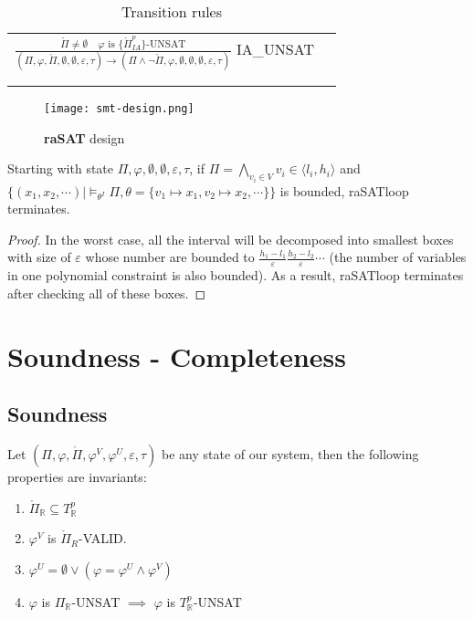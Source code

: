 \begin{table*}[t]
\begin{tabular}{ll}
  \large 
  $\frac{\mathring{\Pi} \not= \emptyset \quad \varphi \text{ is }  \{\mathring{\Pi}^p_{IA}\}\text{-UNSAT}}{(\Pi, \varphi, \mathring{\Pi}, \emptyset, \emptyset, \varepsilon, \tau) \to (\Pi \wedge \neg\mathring{\Pi}, \varphi, \emptyset, \emptyset, \emptyset, \varepsilon, \tau)}$ \tiny IA\_UNSAT \\\\
  \hline\\
  \end{tabular}
  \caption{Transition rules}\label{tab:transition-rules}
\end{table*}

\begin{figure}[ht]
\centering
\texttt{[image: smt-design.png]} 
\caption{\textbf{raSAT} design} 
\label{fig:smt-design} 
\end{figure}

\begin{theorem} \label{theorem:terminating}
Starting with state $\Pi, \varphi, \emptyset, \emptyset, \varepsilon, \tau$, if $\Pi = \bigwedge\limits_{v_i \in V} v_i \in \langle l_i, h_i \rangle$ and $\{(x_1, x_2, \cdots) | \models_{\theta^I} \Pi, \theta = \{v_1 \mapsto x_1, v_2 \mapsto x_2, \cdots\} \}$ is bounded, raSATloop terminates.
\end{theorem}

\begin{proof}
In the worst case, all the interval will be decomposed into smallest boxes with size of $\varepsilon$ whose number are bounded to $\frac{h_1 - l_1}{\varepsilon}\frac{h_2 - l_2}{\varepsilon}\cdots$ (the number of variables in one polynomial constraint is also bounded). As a result, raSATloop terminates after checking all of these boxes.
\end{proof}

\section{Soundness - Completeness}
\subsection{Soundness}
\begin{theorem}
Let $(\Pi, \varphi, \mathring{\Pi}, \varphi^V, \varphi^U, \varepsilon, \tau)$ be any state of our system, then the following properties are invariants:
\begin{enumerate}
\item $\mathring{\Pi}_\mathbb{R} \subseteq T^p_\mathbb{R}$
\item $\varphi^V$ is $\mathring{\Pi}_{R}$-VALID.
\item $\varphi^U = \emptyset \vee (\varphi = \varphi^U \wedge \varphi^V)$
\item $\varphi$ is $\Pi_\mathbb{R}$-UNSAT $\implies$ $\varphi$ is $T^p_\mathbb{R}$-UNSAT
\end{enumerate}
\end{theorem}

